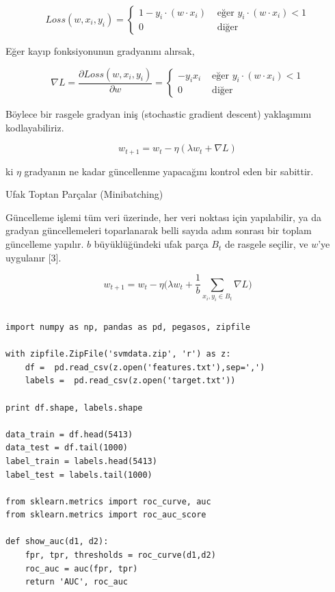 \documentclass[12pt,fleqn]{article}\usepackage{../../common}
\begin{document}
$$
Loss(w,x_i,y_i) = 
\left\{ \begin{array}{ll}
1-y_i \cdot (w \cdot x_i) & \textrm{ eğer } y_i \cdot (w \cdot x_i) < 1 \\
0 & \textrm { diğer }
\end{array} \right.
$$

Eğer kayıp fonksiyonunun gradyanını alırsak,

$$
\nabla L = \frac{\partial Loss(w,x_i,y_i)}{\partial w} =
\left\{ \begin{array}{ll}
-y_i  x_i & \textrm{ eğer } y_i \cdot (w \cdot x_i) < 1 \\
0 & \textrm { diğer }
\end{array} \right.
$$

Böylece bir rasgele gradyan iniş (stochastic gradient descent) yaklaşımını
kodlayabiliriz. 

$$ w_{t+1} = w_t - \eta (\lambda w_t + \nabla L )$$

ki $\eta$ gradyanın ne kadar güncellenme yapacağını kontrol eden bir sabittir.

Ufak Toptan Parçalar (Minibatching)

Güncelleme işlemi tüm veri üzerinde, her veri noktası için yapılabilir, ya da
gradyan güncellemeleri toparlanarak belli sayıda adım sonrası bir toplam
güncelleme yapılır. $b$ büyüklüğündeki ufak parça $B_t$ de rasgele seçilir, ve
$w$'ye uygulanır [3].

$$
w_{t+1} = w_t - \eta \bigg(
\lambda w_t + \frac{1}{b} \sum_{x_i,y_i \in B_t} \nabla L
\bigg)
$$

\inputminted[fontsize=\footnotesize]{python}{pegasos.py}

\begin{verbatim}
import numpy as np, pandas as pd, pegasos, zipfile

with zipfile.ZipFile('svmdata.zip', 'r') as z:
    df =  pd.read_csv(z.open('features.txt'),sep=',')
    labels =  pd.read_csv(z.open('target.txt'))
    
print df.shape, labels.shape

data_train = df.head(5413)
data_test = df.tail(1000)
label_train = labels.head(5413)
label_test = labels.tail(1000)

from sklearn.metrics import roc_curve, auc
from sklearn.metrics import roc_auc_score

def show_auc(d1, d2):
    fpr, tpr, thresholds = roc_curve(d1,d2)
    roc_auc = auc(fpr, tpr)
    return 'AUC', roc_auc
\end{verbatim}
\end{document}
